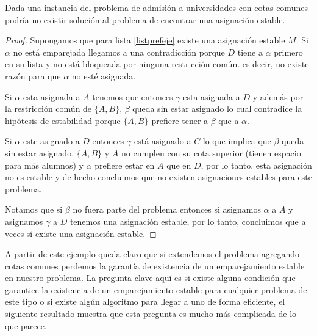 \begin{teo} \cite{Todo}
\label{ejemplo teorema}
Dada una instancia del problema de admisión a universidades con cotas comunes podría no existir solución al problema de encontrar una asignación estable.
\end{teo}
\begin{proof}
Supongamos que para lista \ref{listprefeje} existe una asignación estable $M$. Si $\alpha$ no está emparejada llegamos a una contradicción porque $D$ tiene a $\alpha$ primero en su lista y no está bloqueada por ninguna restricción común. es decir, no existe razón para que $\alpha$ no esté asignada. 

Si $\alpha$ esta asignada a $A$ tenemos que entonces $\gamma$ esta asignada a $D$ y además por la restricción común de $\{A,B\}$, $\beta$ queda sin estar asignado lo cual contradice la hipótesis de estabilidad porque $\{A,B\}$ prefiere tener a $\beta$ que a $\alpha$. 

Si $\alpha$ este asignado a $D$ entonces $\gamma$ está asignado a $C$ lo que implica que $\beta$ queda sin estar asignado. $\{A,B\}$ y $A$ no cumplen con su cota superior (tienen espacio para más alumnos) y $\alpha$ prefiere estar en $A$ que en $D$, por lo tanto, esta asignación no es estable y de hecho concluimos que no existen asignaciones estables para este problema. 

Notamos que si $\beta$ no fuera parte del problema entonces si asignamos $\alpha$ a $A$ y asignamos $\gamma$ a $D$ tenemos una asignación estable, por lo tanto, concluimos que a veces sí existe una asignación estable. 
\end{proof}


A partir de este ejemplo queda claro que si extendemos el problema agregando cotas comunes perdemos la garantía de existencia de un emparejamiento estable en nuestro problema. La pregunta clave aquí es si existe alguna condición que garantice la existencia de un emparejamiento estable para cualquier problema de este tipo o si existe algún algoritmo para llegar a uno de forma eficiente, el siguiente resultado muestra que esta pregunta es mucho más complicada de lo que parece. 

